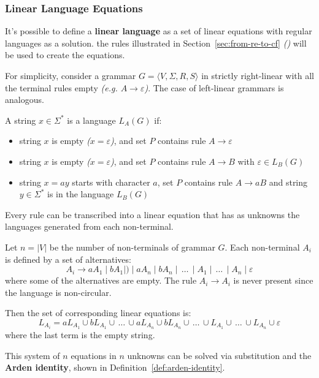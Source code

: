 \documentclass[english]{article}
\begin{document}
\subsubsection{Linear Language Equations}

It's possible to define a \textbf{linear language} as a set of linear equations with regular languages as a solution.
the rules illustrated in Section~\ref{sec:from-re-to-cf} \textit{()} will be used to create the equations.

For simplicity, consider a grammar \(G = \langle V, \Sigma, R, S \rangle\) in strictly right-linear with all the terminal rules empty \textit{(e.g. \(A \rightarrow \varepsilon\))}.
The case of left-linear grammars is analogous.

A string \(x \in \Sigma^\ast\) is a language \(L_A(G)\) if:

\begin{itemize}
  \item string \(x\) is empty \textit{(\(x = \varepsilon\))}, and set \(P\) contains rule \(A \rightarrow \varepsilon\)
  \item string \(x\) is empty \textit{(\(x = \varepsilon\))}, and set \(P\) contains rule \(A \rightarrow B\) with \(\varepsilon \in L_B(G)\)
  \item string \(x = ay\) starts with character \(a\), set \(P\) contains rule \(A \rightarrow aB\) and string \(y \in \Sigma^\ast\) is in the language \(L_B(G)\)
\end{itemize}

Every rule can be transcribed into a linear equation that has as unknowns the languages generated from each non-terminal.

Let \(n = |V|\) be the number of non-terminals of grammar \(G\).
Each non-terminal \(A_i\) is defined by a set of alternatives:
\[ A_i \rightarrow a A_1 \mid b A_1 \mid ) \mid a A_n \mid b A_n \mid \,\ldots\, \mid A_1 \mid \,\ldots\, \mid A_n \mid \varepsilon \]
where some of the alternatives are empty. The rule \(A_i \rightarrow A_i\) is never present since the language is non-circular.

Then the set of corresponding linear equations is:
\[ L_{A_i} = a L_{A_1} \cup b L_{A_1} \cup \,\ldots\, \cup a L_{A_n} \cup b L_{A_n} \cup \,\ldots\, \cup L_{A_1} \cup \,\ldots\, \cup L_{A_n} \cup \varepsilon \]
where the last term is the empty string.

This system of \(n\) equations in \(n\) unknowns can be solved via substitution and the \textbf{Arden identity}, shown in Definition~\ref{def:arden-identity}.
\end{document}
